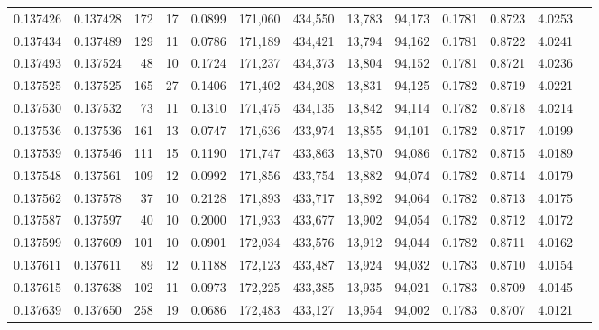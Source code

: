 \begin{tabular}{rrrrrrrrrrrrr}
0.137426 & 0.137428 &   172 &  17 &                                     0.0899 & 171,060 & 434,550 &  13,783 &  94,173 & 0.1781 & 0.8723 & 4.0253 \\
0.137434 & 0.137489 &   129 &  11 &                                     0.0786 & 171,189 & 434,421 &  13,794 &  94,162 & 0.1781 & 0.8722 & 4.0241 \\
0.137493 & 0.137524 &    48 &  10 &                                     0.1724 & 171,237 & 434,373 &  13,804 &  94,152 & 0.1781 & 0.8721 & 4.0236 \\
0.137525 & 0.137525 &   165 &  27 &                                     0.1406 & 171,402 & 434,208 &  13,831 &  94,125 & 0.1782 & 0.8719 & 4.0221 \\
0.137530 & 0.137532 &    73 &  11 &                                     0.1310 & 171,475 & 434,135 &  13,842 &  94,114 & 0.1782 & 0.8718 & 4.0214 \\
0.137536 & 0.137536 &   161 &  13 &                                     0.0747 & 171,636 & 433,974 &  13,855 &  94,101 & 0.1782 & 0.8717 & 4.0199 \\
0.137539 & 0.137546 &   111 &  15 &                                     0.1190 & 171,747 & 433,863 &  13,870 &  94,086 & 0.1782 & 0.8715 & 4.0189 \\
0.137548 & 0.137561 &   109 &  12 &                                     0.0992 & 171,856 & 433,754 &  13,882 &  94,074 & 0.1782 & 0.8714 & 4.0179 \\
0.137562 & 0.137578 &    37 &  10 &                                     0.2128 & 171,893 & 433,717 &  13,892 &  94,064 & 0.1782 & 0.8713 & 4.0175 \\
0.137587 & 0.137597 &    40 &  10 &                                     0.2000 & 171,933 & 433,677 &  13,902 &  94,054 & 0.1782 & 0.8712 & 4.0172 \\
0.137599 & 0.137609 &   101 &  10 &                                     0.0901 & 172,034 & 433,576 &  13,912 &  94,044 & 0.1782 & 0.8711 & 4.0162 \\
0.137611 & 0.137611 &    89 &  12 &                                     0.1188 & 172,123 & 433,487 &  13,924 &  94,032 & 0.1783 & 0.8710 & 4.0154 \\
0.137615 & 0.137638 &   102 &  11 &                                     0.0973 & 172,225 & 433,385 &  13,935 &  94,021 & 0.1783 & 0.8709 & 4.0145 \\
0.137639 & 0.137650 &   258 &  19 &                                     0.0686 & 172,483 & 433,127 &  13,954 &  94,002 & 0.1783 & 0.8707 & 4.0121 \\

\end{tabular}
